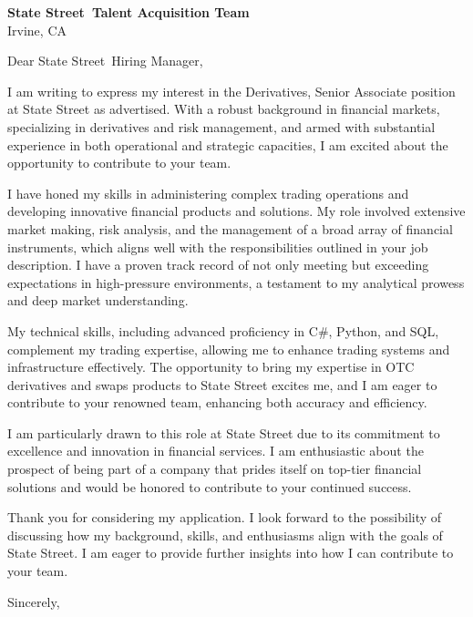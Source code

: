 \documentclass{letter}
\newcommand{\company}{State Street}
\begin{document}
\begin{letter}{\textbf{\company\ Talent Acquisition Team} \\                
    Irvine, CA }

\opening{Dear \company\ Hiring Manager,}

I am writing to express my interest in the Derivatives, Senior Associate position at State Street as advertised. With a robust background in financial markets, specializing in derivatives and risk management, and armed with substantial experience in both operational and strategic capacities, I am excited about the opportunity to contribute to your team.

I have honed my skills in administering complex trading operations and developing innovative financial products and solutions. My role involved extensive market making, risk analysis, and the management of a broad array of financial instruments, which aligns well with the responsibilities outlined in your job description. I have a proven track record of not only meeting but exceeding expectations in high-pressure environments, a testament to my analytical prowess and deep market understanding.

My technical skills, including advanced proficiency in C#, Python, and SQL, complement my trading expertise, allowing me to enhance trading systems and infrastructure effectively. The opportunity to bring my expertise in OTC derivatives and swaps products to State Street excites me, and I am eager to contribute to your renowned team, enhancing both accuracy and efficiency.

I am particularly drawn to this role at State Street due to its commitment to excellence and innovation in financial services. I am enthusiastic about the prospect of being part of a company that prides itself on top-tier financial solutions and would be honored to contribute to your continued success.

Thank you for considering my application. I look forward to the possibility of discussing how my background, skills, and enthusiasms align with the goals of State Street. I am eager to provide further insights into how I can contribute to your team.



\closing{Sincerely,}

\end{letter}
\end{document}
